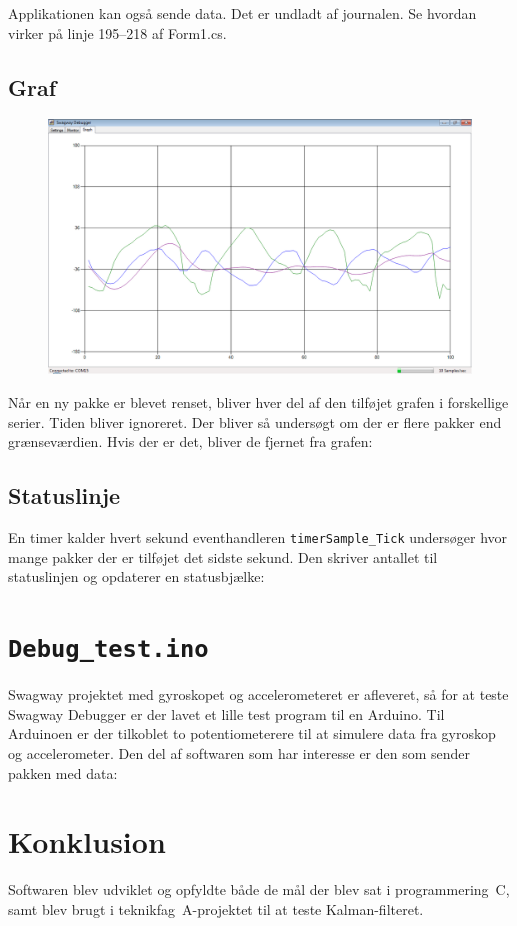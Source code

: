 \documentclass[a4paper,oneside,article,danish,table]{memoir}
\newcommand{\form}[2]{}
\begin{document}
Applikationen kan også sende data. Det er undladt af journalen. Se hvordan virker på linje 195--218 af Form1.cs.

\section{Graf}
\begin{figure}[htbp]
  \centering
  \includegraphics[width=1\textwidth]{graph.png}
\end{figure}
Når en ny pakke er blevet renset, bliver hver del af den tilføjet grafen i forskellige serier. Tiden bliver ignoreret. Der bliver så undersøgt om der er flere pakker end grænseværdien. Hvis der er det, bliver de fjernet fra grafen:
\form{224}{239}

\section{Statuslinje}
En timer kalder hvert sekund eventhandleren \texttt{timerSample\_Tick} undersøger hvor mange pakker der er tilføjet det sidste sekund. Den skriver antallet til statuslinjen og opdaterer en statusbjælke:
\form{245}{258}

\chapter{\texttt{Debug\_test.ino}}
Swagway projektet med gyroskopet og accelerometeret er afleveret, så for at teste Swagway Debugger er der lavet et lille test program til en Arduino. Til Arduinoen er der tilkoblet to potentiometerere til at simulere data fra gyroskop og accelerometer. Den del af softwaren som har interesse er den som sender pakken med data:


\chapter{Konklusion}
Softwaren blev udviklet og opfyldte både de mål der blev sat i programmering~C, samt blev brugt i teknikfag~A-projektet til at teste Kalman-filteret.
\end{document}

